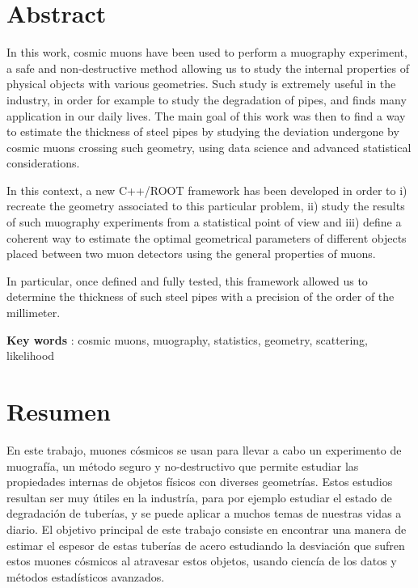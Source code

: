 \documentclass[a4paper, 11pt]{report}
\begin{document}

\clearpage
\thispagestyle{empty}
\phantom{a}
\vfill
\newpage


\setcounter{page}{1}

\section*{\huge{Abstract}}

In this work, cosmic muons have been used to perform a muography experiment, a safe and non-destructive method allowing us to study the internal properties of physical objects with various geometries. Such study is extremely useful in the industry, in order for example to study the degradation of pipes, and finds many application in our daily lives. The main goal of this work was then to find a way to estimate the thickness of steel pipes by studying the deviation undergone by cosmic muons crossing such geometry, using data science and advanced statistical considerations.

In this context, a new C++/ROOT framework has been developed in order to i) recreate the geometry associated to this particular problem, ii) study the results of such muography experiments from a statistical point of view and iii) define a coherent way to estimate the optimal geometrical parameters of different objects placed between two muon detectors using the general properties of muons.

In particular, once defined and fully tested, this framework allowed us to determine the thickness of such steel pipes with a precision of the order of the millimeter.

\begin{center}
\textbf{Key words} : cosmic muons, muography, statistics, geometry, scattering, likelihood
\end{center}

\section*{\huge{Resumen}} 

En este trabajo, muones c\'osmicos se usan para llevar a cabo un experimento de muograf\'ia, un m\'etodo seguro y no-destructivo que permite estudiar las propiedades internas de objetos f\'isicos con diverses geometr\'ias. Estos estudios resultan ser muy \'utiles en la industr\'ia, para por ejemplo estudiar el estado de degradaci\'on de tuber\'ias, y se puede aplicar a muchos temas de nuestras vidas a diario. El objetivo principal de este trabajo consiste en encontrar una manera de estimar el espesor de estas tuber\'ias de acero estudiando la desviaci\'on que sufren estos muones c\'osmicos al atravesar estos objetos, usando cienc\'ia de los datos y m\'etodos estad\'isticos avanzados.
\end{document}
